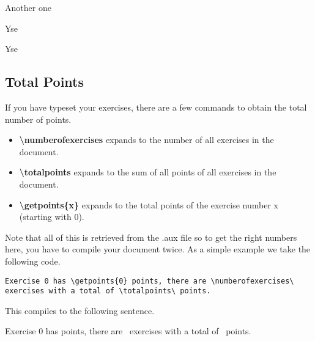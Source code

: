 \documentclass[
  twocolumn,%
  fontsize=9pt,%
  DIV=calc,%
  numbers=noendperiod%
]{scrartcl}
\begin{document}
\begin{exercise}
  Another one
  \begin{subexercise}
    Yse 
  \end{subexercise}
  \begin{subexercise}
    Yse 
  \end{subexercise}
\end{exercise}

\subsection{Total Points}
If you have typeset your exercises, there are a few commands to obtain the total number of points.

\begin{itemize}
  \item \textcolor{NavyBlue}{\ttfamily\bfseries\textbackslash numberofexercises} expands to the number of all exercises in the document.
  \item \textcolor{NavyBlue}{\ttfamily\bfseries\textbackslash totalpoints} expands to the sum of all points of all exercises in the document. 
  \item \textcolor{NavyBlue}{\ttfamily\bfseries\textbackslash getpoints\{x\}} expands to the total points of the exercise number x (starting with $0$). 
\end{itemize}
Note that all of this is retrieved from the .aux file so to get the right numbers here, you have to compile your document twice. As a simple example we take the following code.


\begin{lstlisting}[emph={numberofexercises,totalpoints,getpoints}]
  Exercise 0 has \getpoints{0} points, there are \numberofexercises\ exercises with a total of \totalpoints\ points.
\end{lstlisting}

\noindent This compiles to the following sentence.\smallskip

Exercise 0 has  points, there are \numberofexercises\ exercises with a total of \totalpoints\ points.
\end{document}
